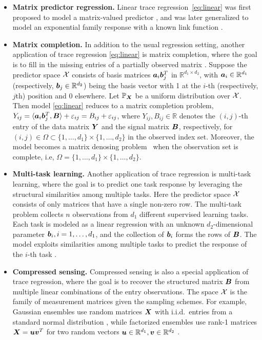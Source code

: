 \documentclass[11pt]{article}
\theoremstyle{plain}
\theoremstyle{definition}
\begin{document}
\begin{itemize}
\item{\bf Matrix predictor regression.} Linear trace regression~\eqref{eq:linear} was first proposed to model a matrix-valued predictor \citep{zhou2014regularized, wang2014network}, and was later generalized to model an exponential family response with a known link function \citep{wang2017generalized, fan2019generalized}. 
\smallskip

\item {\bf Matrix completion.} In addition to the usual regression setting, another application of trace regression \eqref{eq:linear} is matrix completion, where the goal is to fill in the missing entries of a partially observed matrix \citep{Cai2016}. Suppose the predictor space $\mathcal{X}$ consists of basis matrices $\bm{a}_i\bm{b}^T_j$ in $\mathbb{R}^{d_1\times d_2}$, with $\bm{a}_i\in\mathbb{R}^{d_1}$ (respectively, $\bm{b}_j\in\mathbb{R}^{d_2}$) being the basis vector with 1 at the $i$-th (respectively, $j$th) position and 0 elsewhere. Let $\mathbb{P}_{\bm X}$ be a uniform distribution over $\mathcal{X}$. Then model \eqref{eq:linear} reduces to a matrix completion problem, $Y_{ij}=\langle \bm{a}_i \bm{b}^T_j,\bm B \rangle +\varepsilon_{ij}= B_{ij}+\varepsilon_{ij}$, where $Y_{ij}, B_{ij}\in\mathbb{R}$ denotes the $(i,j)$-th entry of the data matrix $\bm Y$ and the signal matrix $\bm B$, respectively, for $(i,j) \in \Omega\subset \{1,\ldots,d_1\}\times\{1,\ldots,d_2\}$ in the observed index set. Moreover, the model becomes a matrix denosing problem~\citep{Ma2016} when the observation set is complete, i.e, $\Omega=\{1,\ldots,d_1\}\times\{1,\ldots,d_2\}$. 
\smallskip

\item {\bf Multi-task learning.} Another application of trace regression is multi-task learning, where the goal is to predict one task response by leveraging the structural similarities among multiple tasks. Here the predictor space $\mathcal{X}$ consists of only matrices that have a single non-zero row. The multi-task problem collects $n$ observations from $d_1$ different supervised learning tasks. Each task is modeled as a linear regression with an unknown $d_2$-dimensional parameter $\bm{b}_i, i=1,\ldots,d_1$, and the collection of $\bm{b}_i$ forms the rows of $\bm B$. The model exploits similarities among multiple tasks to predict the response of the $i$-th task \citep{caruana1997multitask,fan2019generalized}. 
\smallskip

\item {\bf Compressed sensing.} Compressed sensing is also a special application of trace regression, where the goal is to recover the structured matrix $\bm B$ from multiple linear combinations of the entry observations. The space $\mathcal{X}$ is the family of measurement matrices given the sampling schemes. For example, Gaussian ensembles use random matrices $\bm X$ with i.i.d.\ entries from a standard normal distribution \citep{candes2011tight}, while factorized ensembles use rank-1 matrices $\bm X=\bm{u}\bm{v}^T$ for two random vectors $\bm{u}\in\mathbb{R}^{d_1}, \bm{v}\in\mathbb{R}^{d_2}$ \citep{recht2010guaranteed}.
\end{itemize}
\end{document}

